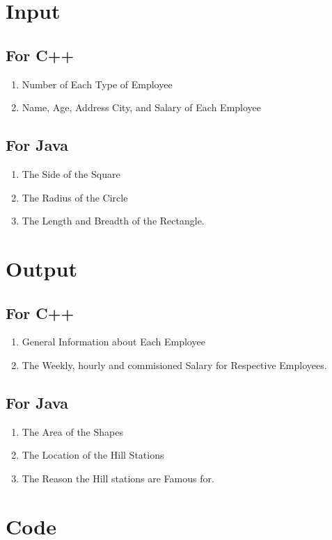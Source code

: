 \documentclass[11pt]{article}
\begin{document}
\section{Input}

\subsection*{For C++}
\begin{enumerate}
	\item Number of Each Type of Employee
	\item Name, Age, Address City, and Salary of Each Employee
\end{enumerate}

\subsection*{For Java}
\begin{enumerate}
	\item The Side of the Square
	\item The Radius of the Circle
	\item The Length and Breadth of the Rectangle.
\end{enumerate}

\section{Output}
\subsection*{For C++}
\begin{enumerate}
	\item General Information about Each Employee
	\item The Weekly, hourly and commisioned Salary for Respective Employees.
\end{enumerate}

\subsection*{For Java}
\begin{enumerate}
	\item The Area of the Shapes
	\item The Location of the Hill Stations
	\item The Reason the Hill stations are Famous for.
\end{enumerate}


\section{Code}
\end{document}

